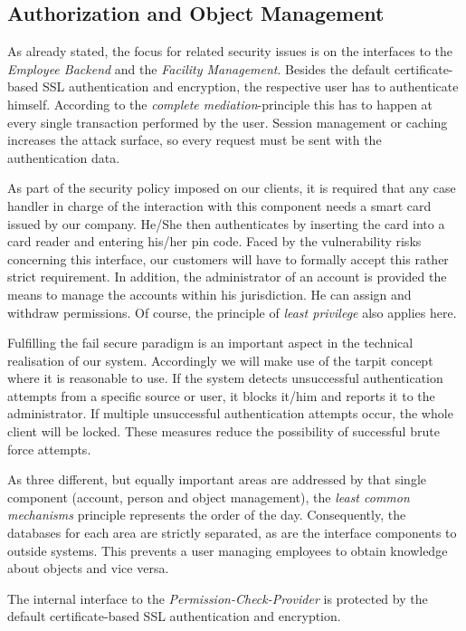 \documentclass[12pt,a4paper,titlepage,oneside]{scrartcl}
\begin{document}
\subsection{Authorization and Object Management}
As already stated, the focus for related security issues is on the interfaces to the \emph{Employee Backend} and the \emph{Facility Management}. Besides the default certificate-based SSL authentication and encryption, the respective user has to authenticate himself. According to the \emph{complete mediation}-principle this has to happen at every single transaction performed by the user. Session management or caching increases the attack surface, so every request must be sent with the authentication data.

As part of the security policy imposed on our clients, it is required that any case handler in charge of the interaction with this component needs a smart card issued by our company. He/She then authenticates by inserting the card into a card reader and entering his/her pin code. Faced by the vulnerability risks concerning this interface, our customers will have to formally accept this rather strict requirement. In addition, the administrator of an account is provided the means to manage the accounts within his jurisdiction. He can assign and withdraw permissions. Of course, the principle of \emph{least privilege} also applies here.

Fulfilling the fail secure paradigm is an important aspect in the technical realisation of our system. Accordingly we will make use of the tarpit concept where it is reasonable to use. If the system detects unsuccessful authentication attempts from a specific source or user, it blocks it/him and reports it to the administrator. If multiple unsuccessful authentication attempts occur, the whole client will be locked. These measures reduce the possibility of successful brute force attempts.

As three different, but equally important areas are addressed by that single component (account, person and object management), the \emph{least common mechanisms} principle represents the order of the day. Consequently, the databases for each area are strictly separated, as are the interface components to outside systems. This prevents a user managing employees to obtain knowledge about objects and vice versa.

The internal interface to the \emph{Permission-Check-Provider} is protected by the default certificate-based SSL authentication and encryption.
\end{document}
